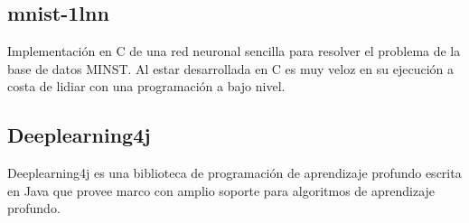 \subsection{mnist-1lnn}
Implementación en C de una red neuronal sencilla para resolver el problema de la base de datos MINST. Al estar desarrollada en C es muy veloz en su ejecución a costa de lidiar con una programación a bajo nivel.

\subsection{Deeplearning4j}
Deeplearning4j es una biblioteca de programación de aprendizaje profundo escrita en Java que provee marco con amplio soporte para algoritmos de aprendizaje profundo.